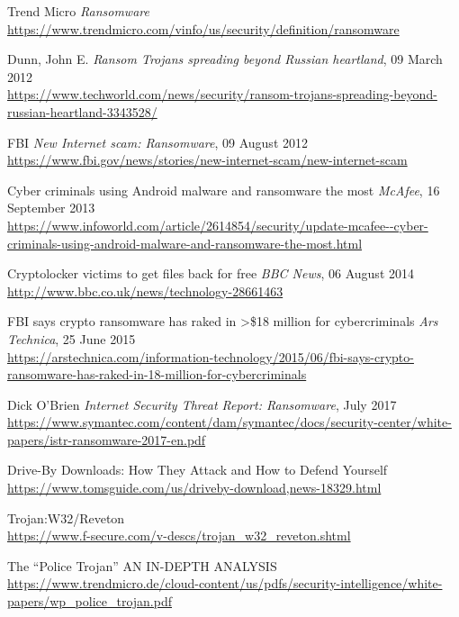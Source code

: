 \documentclass[10pt,a4paper]{article}
\begin{document}
\begin{thebibliography}{1}

Trend Micro
\textit{Ransomware}
\\\url{https://www.trendmicro.com/vinfo/us/security/definition/ransomware}

Dunn, John E.
\textit{Ransom Trojans spreading beyond Russian heartland}, 09 March 2012
\\\url{https://www.techworld.com/news/security/ransom-trojans-spreading-beyond-russian-heartland-3343528/}

FBI
\textit{New Internet scam: Ransomware}, 09 August 2012
\\\url{https://www.fbi.gov/news/stories/new-internet-scam/new-internet-scam}

Cyber criminals using Android malware and ransomware the most
\textit{McAfee}, 16 September 2013
\\\url{https://www.infoworld.com/article/2614854/security/update-mcafee--cyber-criminals-using-android-malware-and-ransomware-the-most.html}

Cryptolocker victims to get files back for free
\textit{BBC News}, 06 August 2014
\\\url{http://www.bbc.co.uk/news/technology-28661463}

FBI says crypto ransomware has raked in >\$18 million for cybercriminals
\textit{Ars Technica}, 25 June 2015
\\\url{https://arstechnica.com/information-technology/2015/06/fbi-says-crypto-ransomware-has-raked-in-18-million-for-cybercriminals}

Dick O’Brien
\textit{Internet Security Threat Report: Ransomware}, July 2017
\\\url{https://www.symantec.com/content/dam/symantec/docs/security-center/white-papers/istr-ransomware-2017-en.pdf}

Drive-By Downloads: How They Attack and How to Defend Yourself
\\\url{https://www.tomsguide.com/us/driveby-download,news-18329.html}

Trojan:W32/Reveton
\\\url{https://www.f-secure.com/v-descs/trojan_w32_reveton.shtml}

The “Police Trojan”
AN IN-DEPTH ANALYSIS
\\\url{https://www.trendmicro.de/cloud-content/us/pdfs/security-intelligence/white-papers/wp_police_trojan.pdf}


\end{thebibliography}
\end{document}
